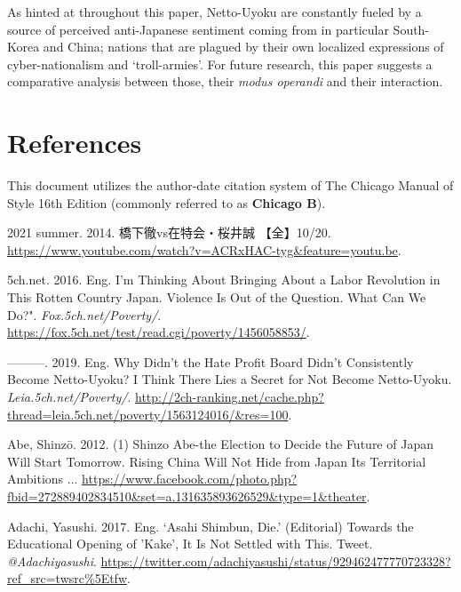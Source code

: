 \documentclass[10pt,british,A4paper,,openany]{memoir}
\begin{document}
As hinted at throughout this paper, Netto-Uyoku are constantly fueled by
a source of perceived anti-Japanese sentiment coming from in particular
South-Korea and China; nations that are plagued by their own localized
expressions of cyber-nationalism and `troll-armies'. For future
research, this paper suggests a comparative analysis between those,
their \emph{modus operandi} and their interaction.

\newpage

\begingroup
{}

\chapter*{References}

\setlength{\parindent}{-0.2in} \setlength{\leftskip}{0.2in}
\setlength{\parskip}{0em} \noindent

This document utilizes the author-date citation system of The Chicago
Manual of Style 16th Edition (commonly referred to as \textbf{Chicago
B}).

\vspace{4mm} \setlength{\parskip}{0em} \footnotesize

\hypertarget{refs}{}
\hypertarget{ref-2021_summer_vs_2014}{}
2021 summer. 2014. 橋下徹vs在特会・桜井誠 【全】10/20.
\url{https://www.youtube.com/watch?v=ACRxHAC-tyg\&feature=youtu.be}.

\hypertarget{ref-5ch.net_eng._2016}{}
5ch.net. 2016. Eng. I'm Thinking About Bringing About a Labor Revolution
in This Rotten Country Japan. Violence Is Out of the Question. What Can
We Do?". \emph{Fox.5ch.net/Poverty/}.
\url{https://fox.5ch.net/test/read.cgi/poverty/1456058853/}.

\hypertarget{ref-5ch.net_eng._2019}{}
---------. 2019. Eng. Why Didn't the Hate Profit Board Didn't
Consistently Become Netto-Uyoku? I Think There Lies a Secret for Not
Become Netto-Uyoku. \emph{Leia.5ch.net/Poverty/}.
\url{http://2ch-ranking.net/cache.php?thread=leia.5ch.net/poverty/1563124016/\&res=100}.

\hypertarget{ref-abe_1_2012}{}
Abe, Shinzō. 2012. (1) Shinzo Abe-the Election to Decide the Future of
Japan Will Start Tomorrow. Rising China Will Not Hide from Japan Its
Territorial Ambitions ...
\url{https://www.facebook.com/photo.php?fbid=272889402834510\&set=a.131635893626529\&type=1\&theater}.

\hypertarget{ref-adachi_eng._2017}{}
Adachi, Yasushi. 2017. Eng. `Asahi Shimbun, Die.' (Editorial) Towards
the Educational Opening of 'Kake', It Is Not Settled with This. Tweet.
\emph{@Adachiyasushi}.
\url{https://twitter.com/adachiyasushi/status/929462477770723328?ref_src=twsrc\%5Etfw}.
\end{document}
